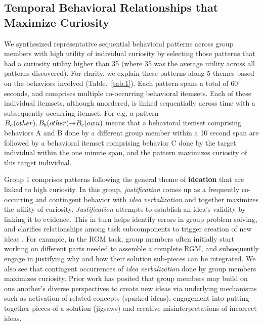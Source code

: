 \documentclass{llncs}
\begin{document}
\subsection{Temporal Behavioral Relationships that Maximize Curiosity}
\vspace{-0.25cm}
We synthesized representative sequential behavioral patterns across group members with high utility of individual curiosity by selecting those patterns that had a curiosity utility higher than 35 (where 35 was the average utility across all patterns discovered). For clarity, we explain these patterns along 5 themes based on the behaviors involved (Table.~\ref{tab:1}). Each pattern spans a total of 60 seconds, and comprises multiple co-occurring behavioral itemsets. Each of these individual itemsets, although unordered, is linked sequentially across time with a subsequently occurring itemset. For e.g, a pattern $B_a(other), B_b(other) {\Large \twoheadrightarrow} B_c(own)$ means that a behavioral itemset comprising behaviors A and B done by a different group member within a 10 second span are followed by a behavioral itemset comprising behavior C done by the target individual within the one minute span, and the pattern maximizes curiosity of this target individual.

Group 1 comprises patterns following the general theme of {\bf ideation} that are linked to high curiosity. In this group, {\em justification} comes up as a frequently co-occurring and contingent behavior with {\em idea verbalization} and together maximizes the utility of curiosity. {\em Justification} attempts to establish an idea's validity by linking it to evidence. This in turn helps identify errors in group problem solving, and clarifies relationships among task subcomponents to trigger creation of new ideas \cite{chen2012social}. For example, in the RGM task, group members often initially start working on different parts needed to assemble a complete RGM, and subsequently engage in justifying why and how their solution sub-pieces can be integrated. We also see that contingent occurrences of {\em idea verbalization} done by group members maximizes curiosity. Prior work \cite{paulus2003enhancing} has posited that group members may build on one another's diverse perspectives to create new ideas via underlying mechanisms such as activation of related concepts (sparked ideas), engagement into putting together pieces of a solution (jigsaws) and creative misinterpretations of incorrect ideas.

\vspace{-0.5cm}
\end{document}
